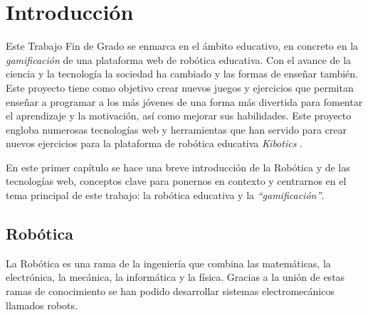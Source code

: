 \chapter{Introducción}
\label{chap:introduccion} 
Este Trabajo Fin de Grado se enmarca en el ámbito educativo, en concreto en la \textit{gamificación} de una plataforma web de robótica educativa. Con el avance de la ciencia y la tecnología la sociedad ha cambiado y las formas de enseñar también. Este proyecto tiene como objetivo crear nuevos juegos y ejercicios que permitan enseñar a programar a los más jóvenes de una forma más divertida para fomentar el aprendizaje y la motivación, así como mejorar sus habilidades. Este proyecto engloba numerosas tecnologías web y herramientas que han servido para crear nuevos ejercicios para la plataforma de robótica educativa \textit{Kibotics} \cite{intro}.

En este primer capítulo se hace una breve introducción de la Robótica y de las tecnologías web, conceptos clave para ponernos en contexto y centrarnos en el tema principal de este trabajo: la robótica educativa y la \textit{``gamificación''}.


\section{Robótica}\label{motivacion}
La Robótica es una rama de la ingeniería que combina las matemáticas, la electrónica, la mecánica, la informática y la física. Gracias a la unión de estas ramas de conocimiento se han podido desarrollar sistemas electromecánicos llamados robots. 

